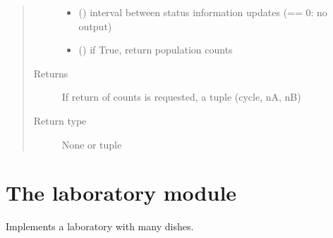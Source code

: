\documentclass[a4paper,10pt,english]{sphinxmanual}
\begin{document}
\begin{fulllineitems}
\begin{fulllineitems}
\begin{quote}
\begin{description}
\begin{itemize}
\item {} 
 () \textendash{} interval between status information updates (== 0: no output)

\item {} 
 () \textendash{} if True, return population counts

\end{itemize}

\item[{Returns}] \leavevmode
If return of counts is requested, a tuple (cycle, nA, nB)

\item[{Return type}] \leavevmode
None or tuple

\end{description}\end{quote}

\end{fulllineitems}


\end{fulllineitems}



\section{The laboratory module}
\label{\detokenize{sim_and_lab:module-biolab.laboratory}}\label{\detokenize{sim_and_lab:the-laboratory-module}}
Implements a laboratory with many dishes.
\end{document}
